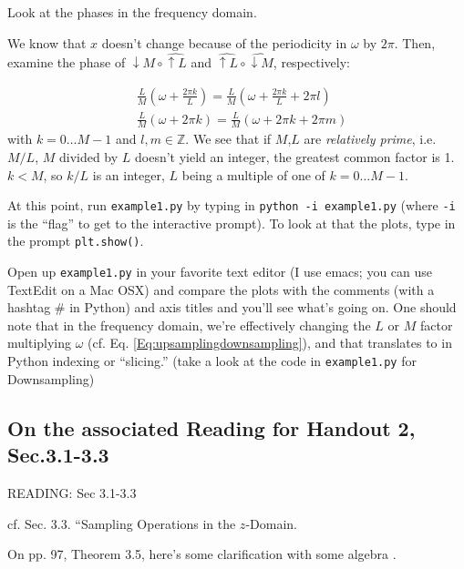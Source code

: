 \documentclass[twoside]{amsart}
\theoremstyle{plain}
\theoremstyle{definition}
\theoremstyle{remark}
\numberwithin{equation}{section}
\begin{document}
Look at the phases in the frequency domain.  

We know that $\widehat{x}$ doesn't change because of the periodicity in $\omega$ by $2\pi$.  Then, examine the phase of $\widehat{ \downarrow M} \circ \widehat{ \uparrow L}$ and $\widehat{ \uparrow L} \circ \widehat{ \downarrow M}$, respectively:

\[
\begin{aligned}
  & \frac{L}{M} ( \omega + \frac{2\pi k}{L } ) = \frac{L}{M} ( \omega + \frac{2\pi k}{L} + 2\pi l ) \\ 
  &  \frac{L}{M} ( \omega + 2\pi k ) = \frac{L}{M}( \omega  +2\pi k + 2\pi m)
\end{aligned}
\]
with $k=0\dots M-1$ and $l,m\in \mathbb{Z}$.  We see that if $M$,$L$ are \emph{relatively prime}, i.e. $M/L$, $M$ divided by $L$ doesn't yield an integer, the greatest common factor is 1.  $k < M$, so $k/L$ is an integer, $L$ being a multiple of one of $k=0\dots M-1$.  


At this point, run \verb|example1.py| by typing in \verb|python -i example1.py| (where \verb|-i| is the ``flag'' to get to the interactive prompt).  To look at that the plots, type in the prompt \verb|plt.show()|.  

Open up \verb|example1.py| in your favorite text editor (I use emacs; you can use TextEdit on a Mac OSX) and compare the plots with the comments (with a hashtag $\#$ in Python) and axis titles and you'll see what's going on.  One should note that in the frequency domain, we're effectively changing the $L$ or $M$ factor multiplying $\omega$ (cf. Eq. \ref{Eq:upsamplingdownsampling}), and that translates to in Python indexing or ``slicing.'' (take a look at the code in \verb|example1.py| for Downsampling)  



\subsection{On the associated Reading for Handout 2, Sec.3.1-3.3 \cite{GStrangTNguyen1996}}\label{SubSec:Handout2Reading}

READING: Sec 3.1-3.3 \cite{GStrangTNguyen1996}

cf. Sec. 3.3. ``Sampling Operations in the $z$-Domain.  

On pp. 97, Theorem 3.5, here's some clarification with some algebra \cite{GStrangTNguyen1996}.  
\end{document}
